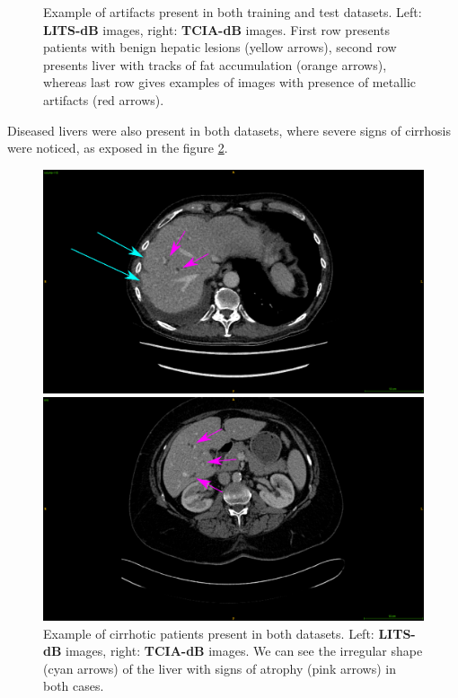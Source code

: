 \documentclass[]{article}
\newcommand{\lmttfont}[1]{{\fontfamily{lmtt}\selectfont #1}}
\begin{document}
\begin{figure}[!ht]
\begin{minipage}{0.45\linewidth}
	\end{minipage}
	\caption{Example of artifacts present in both training and test datasets. Left: \textbf{\lmttfont{LITS-dB}} images, right: \textbf{\lmttfont{TCIA-dB}} images. First row presents patients with benign hepatic lesions (yellow arrows), second row presents liver with tracks of fat accumulation (orange arrows), whereas last row gives examples of images with presence of metallic artifacts (red arrows).}
	\label{fig:InterDb_artifacts}
\end{figure}
Diseased livers were also present in both datasets, where severe signs of cirrhosis were noticed, as exposed in the figure \ref{fig:InterDb_diseasedLivers}.
\begin{figure}[!ht]
	\centering
	\begin{minipage}{0.45\linewidth}
		\includegraphics[width=\linewidth]{../Contributions/images/ResizeLITS_cirrhoticPatientArrows}
	\end{minipage} \hspace{-0.1cm}
	\begin{minipage}{0.45\linewidth}
		\includegraphics[width=\linewidth]{../Contributions/images/ResizeTCIA_cirrhoticPatientArrows}
	\end{minipage}
	\caption{Example of cirrhotic patients present in both datasets.  Left: \textbf{\lmttfont{LITS-dB}} images, right: \textbf{\lmttfont{TCIA-dB}} images. We can see the irregular shape (cyan arrows) of the liver with signs of atrophy (pink arrows) in both cases.}
	\label{fig:InterDb_diseasedLivers}
\end{figure}
\end{document}
